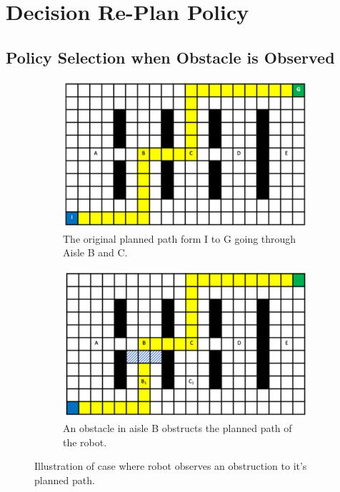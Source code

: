 \documentclass[a4paper,12pt]{article}
\begin{document}
	\pagebreak
	
	\tableofcontents
	
	\pagebreak
	
	\section{Decision Re-Plan Policy}

		\subsection{Policy Selection when Obstacle is Observed}
			
			\begin{figure}[H]
				\centering
				\begin{subfigure}{.4\textwidth}
					\centering
					\includegraphics[width=\linewidth]{originalPlannedPath.png}
					\caption{The original planned path form I to G going through Aisle B and C.}
					\label{fig:originalPlannedPath}
				\end{subfigure}
				\begin{subfigure}{.4\textwidth}
					\centering
					\includegraphics[width=\linewidth]{blockedAisleB.png}
					\caption{An obstacle in aisle B obstructs the planned path of the robot.}
					\label{fig:blockedAisleB}
				\end{subfigure}
				\caption{Illustration of case where robot observes an obstruction to it's planned path.}
				\label{fig:task1_1Figures}
			\end{figure}
\end{document}
